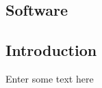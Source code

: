 
\vspace*{8.5cm}

\begin{flushright}
	\section{Software}
\end{flushright}

\subsection{Introduction}
	Enter some text here